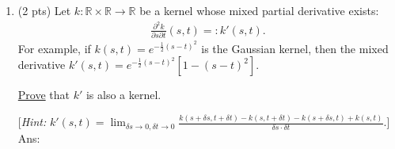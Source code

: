 \documentclass[10pt,letter,notitlepage]{article}
\newcommand{\RR}{\mathds{R}}
\newcommand{\ans}[1]{{\color{blue}\textsf{Ans}: #1}}
\begin{document}
\begin{exercise}
\begin{enumerate}
			\ans{\vskip5cm}

			\item (2 pts) Let $k: \RR\times \RR \to \RR$ be a kernel whose mixed partial derivative exists:
			\begin{align}
			\frac{\partial^2 k}{\partial s \partial t}(s,t) =: k'(s,t).
			\end{align}
			For example, if $k(s,t) = e^{-\tfrac{1}{2}(s-t)^2}$ is the Gaussian kernel, then the mixed derivative $k'(s,t) = e^{-\tfrac{1}{2}(s-t)^2} [1-(s-t)^2]$.
			
			\uline{Prove} that $k'$ is also a kernel. 
			
			[{\em Hint:} $k'(s, t) = \lim_{\delta s \to0, \delta t\to 0} \frac{k(s+\delta s, t+\delta t) - k(s, t+\delta t) - k(s+\delta s, t) + k( s, t)}{\delta s \cdot \delta t}$.]
			\newpage
			\ans{\vskip9cm}
		\end{enumerate}
	\end{exercise}
	
	
	
\end{document}
